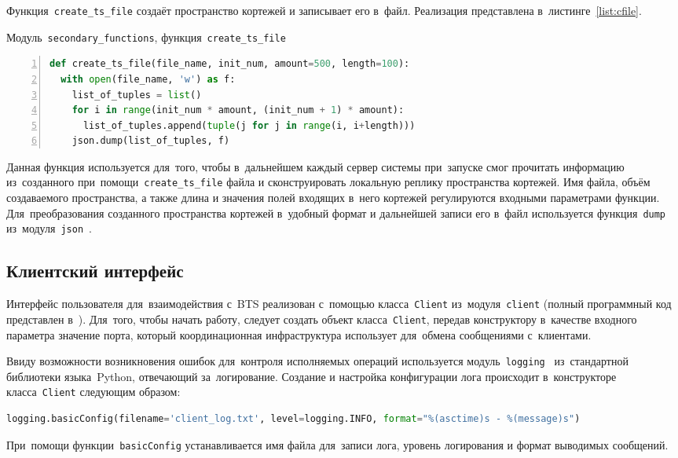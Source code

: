 Функция~\texttt{create_ts_file} создаёт пространство кортежей и записывает его в~файл. Реализация представлена в~листинге~\ref{list:cfile}.
\begin{ListingEnv}[b]\caption{Модуль~\texttt{secondary\_functions}, функция~\texttt{create\_ts\_file}}\label{list:cfile}
	\begin{lstlisting}[language=Python, numbers=left]
def create_ts_file(file_name, init_num, amount=500, length=100):
  with open(file_name, 'w') as f:
    list_of_tuples = list()
    for i in range(init_num * amount, (init_num + 1) * amount):
      list_of_tuples.append(tuple(j for j in range(i, i+length)))
    json.dump(list_of_tuples, f)
	\end{lstlisting}
\end{ListingEnv}
Данная функция используется для~того, чтобы в~дальнейшем каждый сервер системы при~запуске смог прочитать информацию из~созданного при~помощи~\texttt{create_ts_file} файла и сконструировать локальную реплику пространства кортежей. Имя файла, объём создаваемого пространства, а также длина и значения полей входящих в~него кортежей регулируются входными параметрами функции. Для~преобразования созданного пространства кортежей в~удобный формат и дальнейшей записи его в~файл используется функция~\texttt{dump} из~модуля~\texttt{json}~\autocite{json}.


\subsection{Клиентский интерфейс}\label{subsec:3}
Интерфейс пользователя для~взаимодействия с~BTS реализован с~помощью класса~\texttt{Client} из~модуля~\texttt{client} (полный программный код представлен в~\autocite{mybts}). Для~того, чтобы начать работу, следует создать объект класса~\texttt{Client}, передав конструктору в~качестве входного параметра значение порта, который координационная инфраструктура использует для~обмена сообщениями с~клиентами.

Ввиду возможности возникновения ошибок для~контроля исполняемых операций используется модуль~\texttt{logging}~\autocite{logging} из~стандартной библиотеки языка~Python, отвечающий за~логирование. Создание и настройка конфигурации лога происходит в~конструкторе класса~\texttt{Client} следующим образом:
\begin{lstlisting}[language=Python]
  logging.basicConfig(filename='client_log.txt', level=logging.INFO, format="%(asctime)s - %(message)s")
\end{lstlisting}
При~помощи функции~\texttt{basicConfig} устанавливается имя файла для~записи лога, уровень логирования и формат выводимых сообщений.

